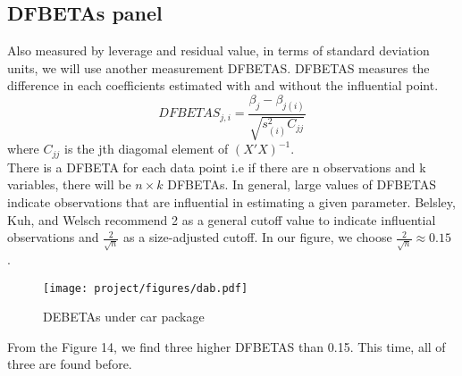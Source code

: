 \documentclass[a4paper]{article}
\begin{document}
\subsection{DFBETAs panel}
Also measured by leverage and residual value, in terms of standard deviation units, we will use another measurement DFBETAS. DFBETAS measures the difference in each coefficients estimated with and without the influential point. \[ DFBETAS_{j,i} = \frac{\beta_j-\beta_{j(i)}}{\sqrt{s_{(i)}^2 C_{jj}}}\] where $C_{jj}$ is the jth diagomal element of $(X'X)^{-1}$. \\
There is a DFBETA for each data point i.e if there are n observations and k variables, there will be $n\times k$ DFBETAs. In general, large values of DFBETAS indicate observations that are influential in estimating a given parameter. Belsley, Kuh, and Welsch recommend 2 as a general cutoff value to indicate influential observations and $\frac{2}{\sqrt{n}}$ as a size-adjusted cutoff. In our figure, we choose $\frac{2}{\sqrt{n}} \approx 0.15$ .
\begin{figure}[!htb]
    \centering
    \texttt{[image: project/figures/dab.pdf]}
    \caption{DEBETAs under car package}
    \label{fig:my_label}
\end{figure}
From the Figure 14, we find three higher DFBETAS than 0.15. This time, all of three are found before.\\
\end{document}
